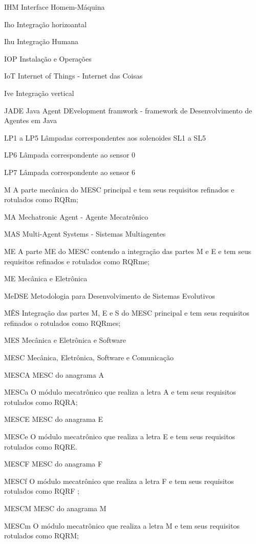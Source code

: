 \documentclass[
12pt,				%
openright,			%
oneside,			%
a4paper,			%
english,			%
brazil				%
]{abntex2}
\begin{document}
\begin{siglas}
\item[IHM] Interface Homem-Máquina
\item[Iho] Integração horizoantal
\item[Ihu] Integração Humana
\item[IOP] Instalação e Operações 
\item[IoT] Internet of Things - Internet das Coisas
\item[Ive] Integração vertical
\item[JADE] Java Agent DEvelopment framwork - framework de Desenvolvimento de Agentes em Java
\item[LP1 a LP5] Lâmpadas correspondentes aos solenoides SL1 a SL5
\item[LP6] Lâmpada correspondente ao sensor 0
\item[LP7] Lâmpada correspondente ao sensor 6
\item[M] A parte mecânica do MESC principal e tem seus requisitos refinados e rotulados como RQRm;
\item[MA] Mechatronic Agent - Agente Mecatrônico
\item[MAS] Multi-Agent Systems - Sistemas Multiagentes
\item[ME] A parte ME do MESC contendo a integração das partes M e E e tem seus requisitos refinados e rotulados como RQRme;
\item[ME]Mecânica e Eletrônica
\item[MeDSE]Metodologia para Desenvolvimento de Sistemas Evolutivos
\item[MÊS] Integração das partes M, E e S do MESC principal e tem seus requisitos refinados o rotulados como RQRmes;
\item[MES]Mecânica e Eletrônica e Software
\item[MESC]Mecânica, Eletrônica, Software e Comunicação
\item[MESCA] MESC do anagrama A
\item[MESCa] O módulo mecatrônico que realiza a letra A e tem seus requisitos rotulados como RQRA;
\item[MESCE] MESC do anagrama E
\item[MESCe] O módulo mecatrônico que realiza a letra E e tem seus requisitos rotulados como RQRE.
\item[MESCF] MESC do anagrama F
\item[MESCf] O módulo mecatrônico que realiza a letra F e tem seus requisitos rotulados como RQRF ; 
\item[MESCM] MESC do anagrama M
\item[MESCm] O módulo mecatrônico que realiza a letra M e tem seus requisitos rotulados como RQRM;

\end{siglas}
\end{document}
